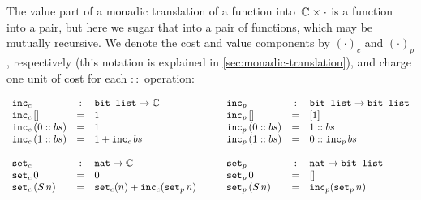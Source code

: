 \noindent
The value part of a monadic translation of a function into~$\mathbb{C}\times\cdot$
is a function into a pair, but here we
sugar that into a pair of functions, which may be mutually recursive.  We
denote the cost and value components by $(\cdot)_c$ and $(\cdot)_p$,
respectively (this notation is explained in
\autoref{sec:monadic-translation}), and charge one unit of cost for each
$::$ operation:
\begin{small}
\[
\begin{array}[t]{lcl}
\texttt{inc}_c &:& \texttt{bit\ list} \to \mathbb{C} \\
\texttt{inc}_c\,[] &=& 1 \\
\texttt{inc}_c\,(0 :: bs) &=& 1 \\
\texttt{inc}_c\,(1 :: bs) &=& 1 + \texttt{inc}_c\,bs
\\ \\
\texttt{set}_c &:& \texttt{nat} \to \mathbb{C} \\
\texttt{set}_c\,0 &=& 0 \\
\texttt{set}_c\,(S\,n) &=& \texttt{set}_c(n) + \texttt{inc}_c(\texttt{set}_p\,n)
\end{array}
\qquad
\begin{array}[t]{lcl}
\texttt{inc}_p &:& \texttt{bit\ list} \to \texttt{bit\ list} \\
\texttt{inc}_p\,[] &=& [1] \\
\texttt{inc}_p\,(0 :: bs) &=& 1 :: bs \\
\texttt{inc}_p\,(1 :: bs) &=& 0 :: \texttt{inc}_p\,bs
\\ \\
\texttt{set}_p &:& \texttt{nat} \to \texttt{bit\ list} \\
\texttt{set}_p\,0 &=& [] \\
\texttt{set}_p\,(S\,n) &=& \texttt{inc}_p(\texttt{set}_p\,n)
\end{array}
\]
\end{small}

